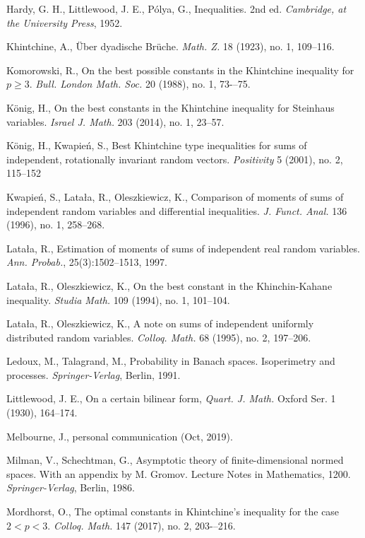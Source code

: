 \documentclass[10pt]{article}
\newcommand{\1}{\textbf{1}}
\theoremstyle{remark}
\theoremstyle{definition}
\begin{document}
\begin{thebibliography}{9}
Hardy, G. H., Littlewood, J. E., P\'olya, G.,
Inequalities.
2nd ed. \emph{Cambridge, at the University Press}, 1952.

Khintchine, A.,
\"Uber dyadische Br\"uche. 
\emph{Math. Z.} 18 (1923), no. 1, 109--116. 


Komorowski, R.,
On the best possible constants in the Khintchine inequality for $p\geq3$.
\emph{Bull. London Math. Soc.} 20 (1988), no. 1, 73-–75. 


K\"onig, H.,
On the best constants in the Khintchine inequality for Steinhaus variables.
\emph{Israel J. Math.} 203 (2014), no. 1, 23--57. 


K\"onig, H., Kwapie\'n, S.,
Best Khintchine type inequalities for sums of independent, rotationally invariant random vectors.
\emph{Positivity} 5 (2001), no. 2, 115--152

Kwapie\'n, S., Lata\l a, R., Oleszkiewicz, K.,
Comparison of moments of sums of independent random variables and differential inequalities.
\emph{J. Funct. Anal.} 136 (1996), no. 1, 258--268. 

Lata\l a, R.,
Estimation of moments of sums of independent real random variables. 
\emph{Ann. Probab.}, 25(3):1502--1513, 1997.


Lata\l a, R., Oleszkiewicz, K.,
On the best constant in the Khinchin-Kahane inequality.
\emph{Studia Math.} 109 (1994), no. 1, 101--104. 


Lata\l a, R., Oleszkiewicz, K.,
A note on sums of independent uniformly distributed random variables. 
\emph{Colloq. Math.} 68 (1995), no. 2, 197--206. 


Ledoux, M., Talagrand, M., Probability in Banach spaces. Isoperimetry and processes. \emph{Springer-Verlag}, Berlin, 1991.

Littlewood, J. E., On a certain bilinear form, \emph{Quart. J. Math.} Oxford Ser. 1 (1930), 164--174.

Melbourne, J., personal communication (Oct, 2019).

Milman, V., Schechtman, G., Asymptotic theory of finite-dimensional normed spaces. With an appendix by M. Gromov. Lecture Notes in Mathematics, 1200. \emph{Springer-Verlag}, Berlin, 1986.

Mordhorst, O.,
The optimal constants in Khintchine's inequality for the case $2<p<3$.
\emph{Colloq. Math.} 147 (2017), no. 2, 203-–216. 


\end{thebibliography}
\end{document}
